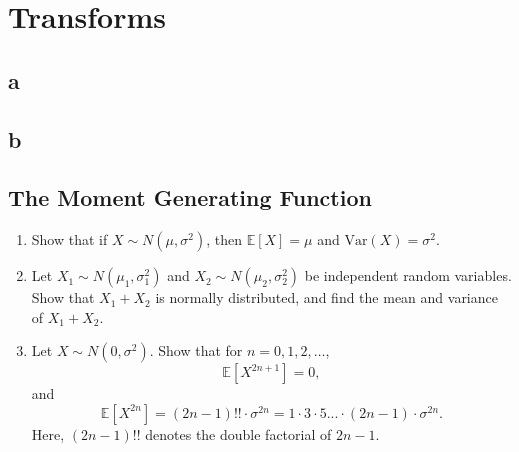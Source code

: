 \section{Transforms}


\subsection{a}
\subsection{b}
\subsection{The Moment Generating Function}
\exercise
\exercise
\exercise
\exercise
\exercise
\begin{enumerate}[label=(\alph*)]
    \item Show that if \( X \sim N(\mu, \sigma^2) \), then \( \mathbb{E}[X] = \mu \) and \( \text{Var}(X) = \sigma^2 \).
    \item Let \( X_1 \sim N(\mu_1, \sigma_1^2) \) and \( X_2 \sim N(\mu_2, \sigma_2^2) \) be independent random variables. Show that \( X_1 + X_2 \) is normally distributed, and find the mean and variance of \( X_1 + X_2 \).
    \item Let \( X \sim N(0,\sigma^2) \). Show that for \( n = 0, 1, 2, \ldots \),
    \[
    \mathbb{E}[X^{2n+1}] = 0, 
    \]
    and 
    \[
    \mathbb{E}[X^{2n}] = (2n-1)!! \cdot \sigma^{2n} = 1 \cdot 3 \cdot 5 ... \cdot (2n-1) \cdot \sigma^{2n}.
    \]
    Here, \( (2n-1)!! \) denotes the double factorial of \( 2n-1 \).
\end{enumerate}
\solution
